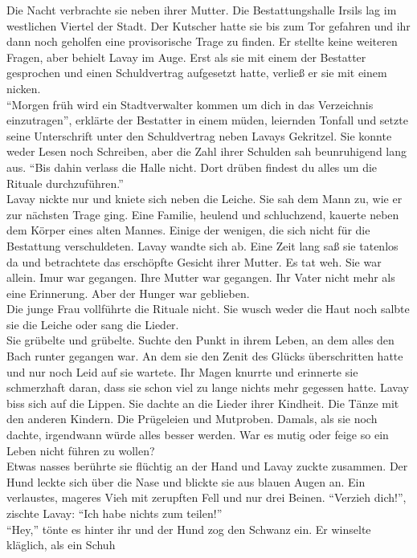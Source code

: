 Die Nacht verbrachte sie neben ihrer Mutter. Die Bestattungshalle Irsils lag im westlichen 
Viertel der Stadt. Der Kutscher hatte sie bis zum Tor gefahren und ihr dann noch geholfen eine 
provisorische Trage zu finden. Er stellte keine weiteren Fragen, aber behielt Lavay im Auge. Erst 
als sie mit einem der Bestatter gesprochen und einen Schuldvertrag aufgesetzt hatte, verließ er sie 
mit einem nicken.\\
``Morgen früh wird ein Stadtverwalter kommen um dich in das Verzeichnis einzutragen'', erklärte der 
Bestatter in einem müden, leiernden Tonfall und setzte seine Unterschrift unter den Schuldvertrag 
neben Lavays Gekritzel. Sie konnte weder Lesen noch Schreiben, aber die Zahl ihrer Schulden sah 
beunruhigend lang aus. ``Bis dahin verlass die Halle nicht. Dort drüben findest du alles um die 
Rituale durchzuführen.''\\
Lavay nickte nur und kniete sich neben die Leiche. Sie sah dem Mann zu, wie er zur nächsten Trage 
ging. Eine Familie, heulend und schluchzend, kauerte neben dem Körper eines alten Mannes. Einige 
der wenigen, die sich nicht für die Bestattung verschuldeten. Lavay wandte sich ab. Eine Zeit lang 
saß sie tatenlos da und betrachtete das erschöpfte Gesicht ihrer Mutter. Es tat weh. Sie war 
allein. Imur war gegangen. Ihre Mutter war gegangen. Ihr Vater nicht mehr als eine Erinnerung. Aber 
der Hunger war geblieben.\\
Die junge Frau vollführte die Rituale nicht. Sie wusch weder die Haut noch salbte sie die Leiche 
oder sang die Lieder.\\
Sie grübelte und grübelte. Suchte den Punkt in ihrem Leben, an dem alles den Bach runter gegangen 
war. An dem sie den Zenit des Glücks überschritten hatte und nur noch Leid auf sie wartete. Ihr 
Magen knurrte und erinnerte sie schmerzhaft daran, dass sie schon viel zu lange nichts mehr 
gegessen hatte. Lavay biss sich auf die Lippen. Sie dachte an die Lieder ihrer Kindheit. Die Tänze 
mit den anderen Kindern. Die Prügeleien und Mutproben. Damals, als sie noch dachte, irgendwann 
würde alles besser werden. War es mutig oder feige so ein Leben nicht führen zu wollen?\\
Etwas nasses berührte sie flüchtig an der Hand und Lavay zuckte zusammen. Der Hund leckte sich über 
die Nase und blickte sie aus blauen Augen an. Ein verlaustes, mageres Vieh mit zerupften Fell und 
nur drei Beinen. ``Verzieh dich!'', zischte Lavay: ``Ich habe nichts zum teilen!''\\
``Hey,'' tönte es hinter ihr und der Hund zog den Schwanz ein. Er winselte kläglich, als ein Schuh 
